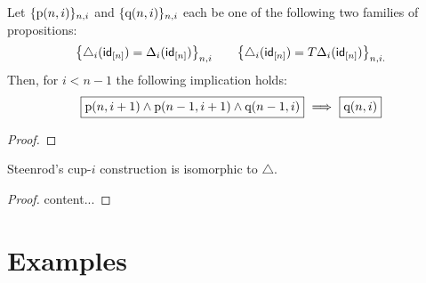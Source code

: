 \begin{lemma}
    Let $\{\mathrm{p}(n, i)\}_{n, i}$ and $\{\mathrm{q}(n, i)\}_{n, i}$ each be one of the following two families of propositions:
    \[ \label{proposition: uniqueness: eq1}
    \big\{ \triangle_i (\mathsf{id}_{[n]}) = \Delta_ i(\mathsf{id}_{[n]}) \big\}_{n, i} \qquad
    \big\{ \triangle_i (\mathsf{id}_{[n]}) = T \Delta_ i(\mathsf{id}_{[n]}) \big\}_{n, i.}
    \]
    Then, for $i < n-1$ the following implication holds:
    \[ \label{proposition: uniqueness: eq2}
    \boxed{\p(n,i+1) \wedge \p(n-1,i+1) \wedge \q(n-1,i)}\ \Longrightarrow\ \boxed{\q(n,i)}
    \]
\end{lemma}

\begin{proof}
%
\end{proof}

\begin{proposition} \label{proposition: uniqueness}
    Steenrod's cup-$i$ construction is isomorphic to $\triangle$.
\end{proposition}

\begin{proof}
    content...
\end{proof}

\section{Examples}

